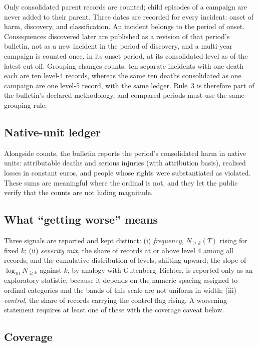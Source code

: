 \documentclass[11pt,a4paper]{article}
\newcommand{\Nk}[1]{N_{\ge #1}}
\begin{document}
Only consolidated parent records are counted; child episodes of a campaign are never added to their parent. Three dates are recorded for every incident: onset of harm, discovery, and classification. An incident belongs to the period of onset. Consequences discovered later are published as a revision of that period's bulletin, not as a new incident in the period of discovery, and a multi-year campaign is counted once, in its onset period, at its consolidated level as of the latest cut-off. Grouping changes counts: ten separate incidents with one death each are ten level-4 records, whereas the same ten deaths consolidated as one campaign are one level-5 record, with the same ledger. Rule~3 is therefore part of the bulletin's declared methodology, and compared periods must use the same grouping rule.

\subsection{Native-unit ledger}

Alongside counts, the bulletin reports the period's consolidated harm in native units: attributable deaths and serious injuries (with attribution basis), realised losses in constant euros, and people whose rights were substantiated as violated. These sums are meaningful where the ordinal is not, and they let the public verify that the counts are not hiding magnitude.

\subsection{What ``getting worse'' means}
\label{sec:signals}

Three signals are reported and kept distinct: (i) \emph{frequency}, $\Nk{k}(T)$ rising for fixed $k$; (ii) \emph{severity mix}, the share of records at or above level 4 among all records, and the cumulative distribution of levels, shifting upward; the slope of $\log_{10}\Nk{k}$ against $k$, by analogy with Gutenberg--Richter, is reported only as an exploratory statistic, because it depends on the numeric spacing assigned to ordinal categories and the bands of this scale are not uniform in width; (iii) \emph{control}, the share of records carrying the control flag rising. A worsening statement requires at least one of these with the coverage caveat below.

\subsection{Coverage}
\end{document}
